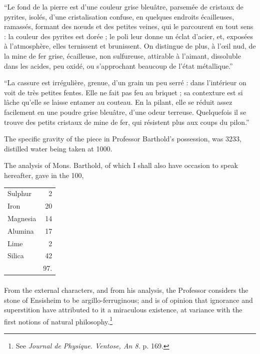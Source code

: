 \documentclass[a4paper, 12pt, oneside, twocolumn]{article}
\begin{document}
``Le fond de la pierre est d'une couleur grise bleuâtre, parsemée de cristaux de pyrites, isolés, d'une cristalisation confuse, en quelques endroits écailleuses, ramassés, formant des nœuds et des petites veines, qui le parcourent en tout sens : la couleur des pyrites est dorée ; le poli leur donne un éclat d'acier, et, exposées à l'atmosphère, elles ternissent et brunissent. On distingue de plus, à l'œil nud, de la mine de fer grise, écailleuse, non sulfureuse, attirable à l'aimant, dissoluble dans les acides, peu oxidé, ou s'approchant beaucoup de l'état métallique.''

``La cassure est irrégulière, grenue, d'un grain un peu serré : dans l'intérieur on voit de très petites fentes. Elle ne fait pas feu au briquet ; sa contexture est si lâche qu'elle se laisse entamer au couteau. En la pilant, elle se réduit assez facilement en une poudre grise bleuâtre, d'une odeur terreuse. Quelquefois il se trouve des petits cristaux de mine de fer, qui résistent plus aux coups du pilon.''

The specific gravity of the piece in Professor Barthold's possession, was 3233, distilled water being taken at 1000.

The analysis of Mons. Barthold, of which I shall also have occasion to speak hereafter, gave in the 100,
\begin{table}[H]
    \centering\bfseries
    \begin{tabular}{l r}
        Sulphur & 2 \\
        Iron & 20 \\ 
        Magnesia & 14 \\ 
        Alumina & 17 \\ 
        Lime & 2 \\ 
        Silica & 42 \\ \hline
        ~ & 97. \\ 
    \end{tabular}
\end{table}
\paragraph{}
From the external characters, and from his analysis, the Professor considers the stone of Ensisheim to be argillo-ferruginous; and is of opinion that ignorance and superstition have attributed to it a miraculous existence, at variance with the first notions of natural philosophy.\footnote{See \emph{Journal de Physique. Ventose, An 8.} p. 169.}
\end{document}
